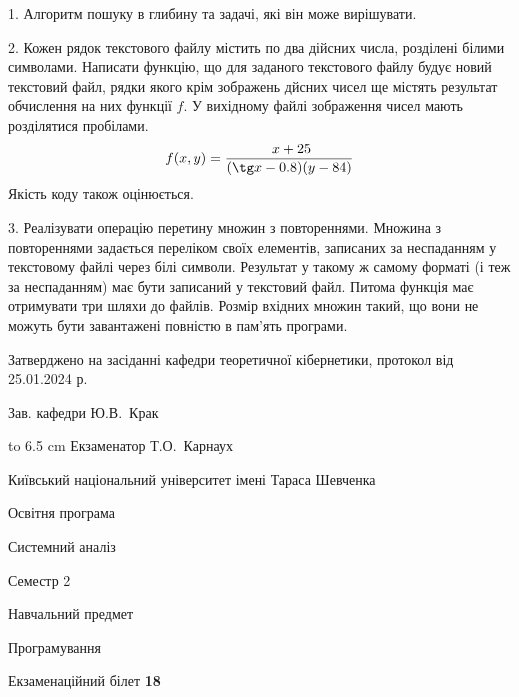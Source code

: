 \documentclass[12pt, ukrainian]{article}
\begin{document}
{%
1. Алгоритм пошуку в глибину та задачі, які він може вирішувати.%
\par
\vspace{2mm}

2. Кожен рядок текстового файлу містить по два дійсних числа, розділені білими символами.
Написати функцію, що для заданого текстового файлу будує новий текстовий файл, рядки якого крім зображень дйсних чисел ще містять результат обчислення на них функції $f$. У вихідному файлі зображення чисел мають розділятися пробілами. 
$$f(x, y) =\frac{\ x + 25}{(\tg x - 0.8) (y - 84)}$$ 
Якість коду також оцінюється.

\par
\vspace{2mm}

3. Реалізувати операцію перетину множин з повтореннями. Множина з повтореннями задається переліком своїх елементів, записаних за неспаданням у текстовому файлі через білі символи. Результат у такому ж самому форматі (і теж за неспаданням) має бути записаний у текстовий файл. Питома функція має отримувати три шляхи до файлів. Розмір вхідних множин такий, що вони не можуть бути завантажені повністю в пам’ять програми.

}
{\smallskip\smallskip \begin {scriptsize} Затверджено на засіданні кафедри теоретичної кібернетики, протокол   від   25.01.2024 р.\par\smallskip\smallskip\smallskip\smallskip
{\parbox {6.5 cm} {Зав. кафедри \dotfill Ю.В.~Крак}}\hspace {0.7cm} {\hbox to 6.5 cm { Екзаменатор \dotfill Т.О.~Карнаух}} \end{scriptsize}}
\vspace{0.9cm}
{{\begin {scriptsize}\par
{ \center  Київський національний університет імені Тараса Шевченка \par}
{\parbox {5 cm}{Освітня програма \hfill}{\parbox {7 cm}{Системний аналіз\hfill}}\parbox {6 cm}{\hfill Семестр 2}}\par
{\parbox {5 cm} {Навчальний предмет \hfill}\parbox {7 cm}{Програмування \hfill}\parbox {6cm}{\hfill}\par}\vspace{-15pt} \end{scriptsize}}{\center Екзаменаційний білет \No \textbf { 18 }\par}}
\end{document}

